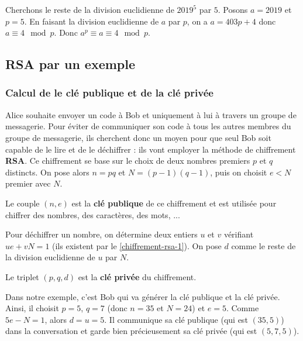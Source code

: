   \begin{example}
    Cherchons le reste de la division euclidienne de $2019^5$ par $5$.
    \newpar
    Posons $a = 2019$ et $p = 5$. En faisant la division euclidienne de $a$ par $p$, on a $a = 403p + 4$ donc $a \equiv 4 \mod p$. Donc $a^p \equiv a \equiv 4 \mod p$.
  \end{example}

  \subsection{RSA par un exemple}
  
  \subsubsection{Calcul de le clé publique et de la clé privée}
  
  Alice souhaite envoyer un code à Bob et uniquement à lui à travers un groupe de messagerie. Pour éviter de communiquer son code à tous les autres membres du groupe de messagerie, ils cherchent donc un moyen pour que seul Bob soit capable de le lire et de le déchiffrer : ils vont employer la méthode de chiffrement \textbf{RSA}.
  \newpar
  Ce chiffrement se base sur le choix de deux nombres premiers $p$ et $q$ distincts. On pose alors $n = pq$ et $N = (p-1)(q-1)$, puis on choisit $e < N$ premier avec $N$.
  
  \begin{definition}
    Le couple $(n, e)$ est la \textbf{clé publique} de ce chiffrement et est utilisée pour chiffrer des nombres, des caractères, des mots, ...
  \end{definition}
  
  Pour déchiffrer un nombre, on détermine deux entiers $u$ et $v$ vérifiant $ue + vN = 1$ (ils existent par le \cref{chiffrement-rsa-1}). On pose $d$ comme le reste de la division euclidienne de $u$ par $N$.
  
  \begin{definition}
    Le triplet $(p, q, d)$ est la \textbf{clé privée} du chiffrement.
  \end{definition}
  
  Dans notre exemple, c'est Bob qui va générer la clé publique et la clé privée. Ainsi, il choisit $p = 5$, $q = 7$ (donc $n = 35$ et $N = 24$) et $e = 5$. Comme $5e - N = 1$, alors $d = u = 5$.
  \newpar
  Il communique sa clé publique (qui est $(35, 5)$) dans la conversation et garde bien précieusement sa clé privée (qui est $(5, 7, 5)$).
  
